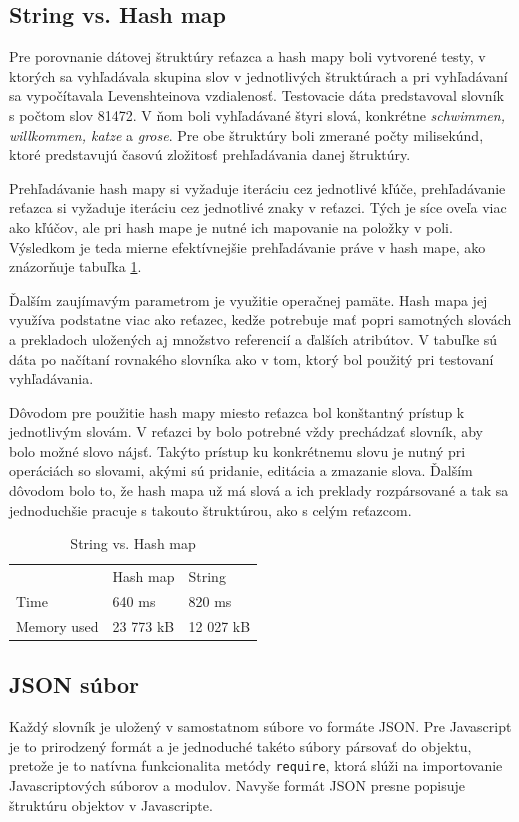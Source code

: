 \documentclass[
  digital, %
  table,   %
  lof,     %
  lot,     %
]{fithesis3}
\begin{document}
\subsection{String vs. Hash map}
Pre porovnanie dátovej štruktúry reťazca a hash mapy boli vytvorené testy, v ktorých sa vyhľadávala skupina slov v jednotlivých štruktúrach a pri vyhľadávaní sa vypočítavala Levenshteinova vzdialenosť. Testovacie dáta predstavoval slovník s počtom slov 81472. V ňom boli vyhľadávané štyri slová, konkrétne \textit{schwimmen, willkommen, katze} a \textit{grose}. Pre obe štruktúry boli zmerané počty milisekúnd, ktoré predstavujú časovú zložitosť prehľadávania danej štruktúry.

Prehľadávanie hash mapy si vyžaduje iteráciu cez jednotlivé kľúče, prehľadávanie reťazca si vyžaduje iteráciu cez jednotlivé znaky v reťazci. Tých je síce oveľa viac ako kľúčov, ale pri hash mape je nutné ich mapovanie na položky v poli. Výsledkom je teda mierne efektívnejšie prehľadávanie práve v hash mape, ako znázorňuje tabuľka \ref{tab:string-hash}.

Ďalším zaujímavým parametrom je využitie operačnej pamäte. Hash mapa jej využíva podstatne viac ako reťazec, kedže potrebuje mať popri samotných slovách a prekladoch uložených aj množstvo referencií a ďalších atribútov. V tabuľke sú dáta po načítaní rovnakého slovníka ako v tom, ktorý bol použitý pri testovaní vyhľadávania.

Dôvodom pre použitie hash mapy miesto reťazca bol konštantný prístup k jednotlivým slovám. V reťazci by bolo potrebné vždy prechádzať slovník, aby bolo možné slovo nájsť. Takýto prístup ku konkrétnemu slovu je nutný pri operáciách so slovami, akými sú pridanie, editácia a zmazanie slova. Ďalším dôvodom bolo to, že hash mapa už má slová a ich preklady rozpársované a tak sa jednoduchšie pracuje s takouto štruktúrou, ako s celým reťazcom. 

\begin{table}[]
\centering
\caption{String vs. Hash map}
\label{tab:string-hash}
\begin{tabular}{lll}
     & Hash map & String   \\
Time & 640 ms   & 820 ms   \\
Memory used & 23 773 kB & 12 027 kB
\end{tabular}
\end{table}

\subsection{JSON súbor}
Každý slovník je uložený v samostatnom súbore vo formáte JSON. Pre Javascript je to prirodzený formát a je jednoduché takéto súbory pársovať do objektu, pretože je to natívna funkcionalita metódy \texttt{require}, ktorá slúži na importovanie Javascriptových súborov a modulov. Navyše formát JSON presne popisuje štruktúru objektov v Javascripte.
\end{document}
